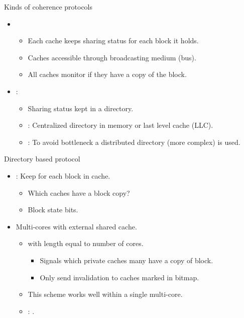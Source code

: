 \begin{frame}[t]{Kinds of coherence protocols}
\begin{itemize}
  \item {} 
    \begin{itemize}
      \item Each cache keeps sharing status for each block it holds.
      \item Caches accessible through broadcasting medium (bus).
      \item All caches monitor if they have a copy of the block.
    \end{itemize}

  \item {}:
    \begin{itemize}
      \item Sharing status kept in a directory.
        \item {}: 
              Centralized directory in memory or last level cache (LLC).
        \item {}: 
              To avoid bottleneck a distributed directory (more complex) is used.
    \end{itemize}
\end{itemize}
\end{frame}

\begin{frame}[t]{Directory based protocol}
\begin{itemize}
  \item {}: Keep  for each block in cache.
    \begin{itemize}
      \item Which caches have a block copy?
      \item Block state bits.
    \end{itemize}

  \item Multi-cores with external shared cache.
    \begin{itemize}
      \item {} with length equal to number of cores.
        \begin{itemize}
          \item Signals which private caches many have a copy of block.
          \item Only send invalidation to caches marked in bitmap.
        \end{itemize}
      \item This scheme works well within a single multi-core.
      \item {}: .
    \end{itemize}
\end{itemize}
\end{frame}

